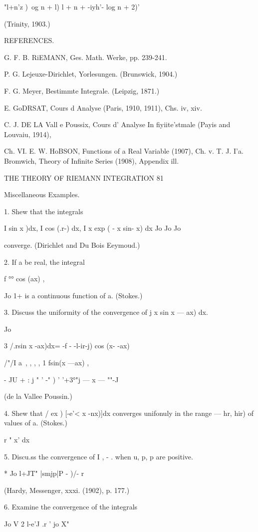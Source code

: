"l+n'z )\ og n + l) l + n + -iyh'- log n + 2)'

(Trinity, 1903.)

REFERENCES.

G. F. B. RiEMANN, Ges. Math. Werke, pp. 239-241.

P. G. Lejeuxe-Dirichlet, Yorlesungen. (Brunswick, 1904.)

F. G. Meyer, Bestimmte Integrale. (Leipzig, 1871.)

E. GoDRSAT, Cours d Analyse (Paris, 1910, 1911), Chs. iv, xiv.

C. J. DE LA Vall e Poussix, Cours d' Analyse In fiyiite'stmale (Payis
and Louvaiu, 1914),

Ch. VI. E. W. HoBSON, Functions of a Real Variable (1907), Ch. v. T.
J. I'a. Bromwich, Theory of Infinite Series (1908), Appendix ill.



THE THEORY OF RIEMANN INTEGRATION 81

Miscellaneous Examples.

1. Shew that the integrals

I sin x )dx, I cos (.r-) dx, I x exp ( - x sin- x) dx Jo Jo Jo

converge. (Dirichlet and Du Bois Eeymoud.)

2. If a be real, the integral

f °° cos (ax) ,

Jo 1+ is a continuous function of a. (Stokes.)

3. Discuss the uniformity of the convergence of j x sin x — ax) dx.

Jo

3 /.rsin x -ax)dx= -f - -l-ir-j) cos (x- -ax)

/"/I a\ , , , , 1 fsin(x —ax) , ~\

- JU + : j " ' -" ) ' '+3°"j — x — ""-J

(de la Vallee Poussin.)

4. Shew that / ex ) [-e'< x -nx)]dx converges unifonuly in the range —
hr, hir) of values of a. (Stokes.)

r " x' dx

5. Discu.ss the convergence of I , - . when u, p, p are positive.

* Jo l+JT" |smjp|P - )/- r

(Hardy, Messenger, xxxi. (1902), p. 177.)

6. Examine the convergence of the integrals

Jo V 2 l-e'J .r ' jo X"

